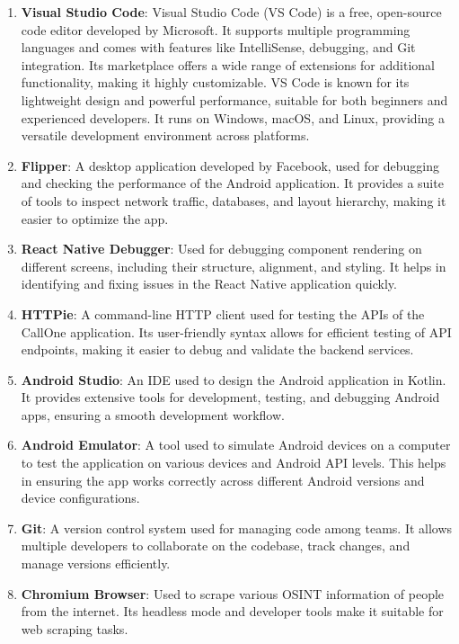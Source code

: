 \begin{enumerate}[label=\roman*.]
  \item \textbf{Visual Studio Code}: Visual Studio Code (VS Code) is a free, open-source code editor developed by Microsoft. It supports multiple programming languages and comes with features like IntelliSense, debugging, and Git integration. Its marketplace offers a wide range of extensions for additional functionality, making it highly customizable. VS Code is known for its lightweight design and powerful performance, suitable for both beginners and experienced developers. It runs on Windows, macOS, and Linux, providing a versatile development environment across platforms.
  \item \textbf{Flipper}: A desktop application developed by Facebook, used for debugging and checking the performance of the Android application.
  It provides a suite of tools to inspect network traffic, databases, and layout hierarchy, making it easier to optimize the app.\cite{FLP}
  \item \textbf{ React Native Debugger}: Used for debugging component rendering on different screens, including their structure, alignment, and styling.
  It helps in identifying and fixing issues in the React Native application quickly.\cite{RNF}
  \item \textbf{HTTPie}: A command-line HTTP client used for testing the APIs of the CallOne application.
  Its user-friendly syntax allows for efficient testing of API endpoints, making it easier to debug and validate the backend services.\cite{Httpie}
  \item \textbf{Android Studio}: An IDE used to design the Android application in Kotlin.
  It provides extensive tools for development, testing, and debugging Android apps, ensuring a smooth development workflow.\cite{Android Studio}
  \item \textbf{Android Emulator}: A tool used to simulate Android devices on a computer to test the application on various devices and Android API levels.
  This helps in ensuring the app works correctly across different Android versions and device configurations.\cite{Android Studio}
  \item \textbf{Git}: A version control system used for managing code among teams.
  It allows multiple developers to collaborate on the codebase, track changes, and manage versions efficiently.\cite{Git}
  \item \textbf{Chromium Browser}: Used to scrape various OSINT information of people from the internet.
  Its headless mode and developer tools make it suitable for web scraping tasks.\cite{Chromium}

\end{enumerate}
